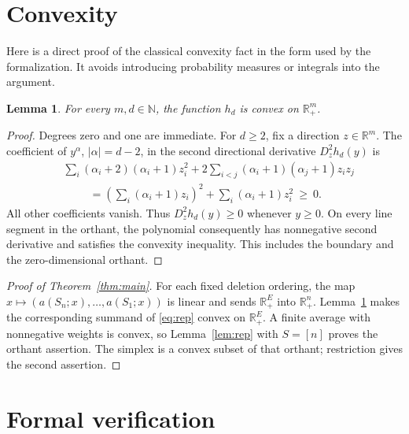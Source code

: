 \documentclass[11pt]{article}
\newtheorem{lemma}[theorem]{Lemma}
\newcommand{\R}{\mathbb R}
\newcommand{\N}{\mathbb N}
\begin{document}
\section{Convexity}

Here is a direct proof of the classical convexity fact in the form used
by the formalization. It avoids introducing probability measures or
integrals into the argument.

\begin{lemma}\label{lem:h}
For every $m,d\in\N$, the function $h_d$ is convex on $\R_+^m$.
\end{lemma}
\begin{proof}
Degrees zero and one are immediate. For $d\geq2$, fix a direction
$z\in\R^m$. The coefficient of $y^\alpha$, $|\alpha|=d-2$, in the
second directional derivative $D_z^2h_d(y)$ is
\begin{align*}
 &\sum_i(\alpha_i+2)(\alpha_i+1)z_i^2
       +2\sum_{i<j}(\alpha_i+1)(\alpha_j+1)z_i z_j\\
 &\hspace{1cm}=
       \left(\sum_i(\alpha_i+1)z_i\right)^2
          +\sum_i(\alpha_i+1)z_i^2\ \geq\ 0.
\end{align*}
All other coefficients vanish. Thus $D_z^2h_d(y)\geq0$ whenever $y\geq0$.
On every line segment in the orthant, the polynomial consequently has
nonnegative second derivative and satisfies the convexity inequality.
This includes the boundary and the zero-dimensional orthant.
\end{proof}

\begin{proof}[Proof of Theorem~\ref{thm:main}]
For each fixed deletion ordering, the map
$x\mapsto(a(S_n;x),\ldots,a(S_1;x))$ is linear and sends $\R_+^E$
into $\R_+^n$. Lemma~\ref{lem:h} makes the corresponding summand of
\eqref{eq:rep} convex on $\R_+^E$. A finite average with nonnegative
weights is convex, so Lemma~\ref{lem:rep} with $S=[n]$ proves the orthant
assertion. The simplex is a convex subset of that orthant; restriction
gives the second assertion.
\end{proof}

\section{Formal verification}
\end{document}
